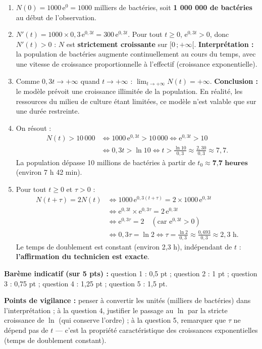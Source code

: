 \documentclass[11pt]{article}
\begin{document}
\begin{corrige}
\begin{enumerate}
\item $N(0)=1000\,\mathrm{e}^{0}=1000$ milliers de bactéries, soit \textbf{1 000 000 de bactéries} au début de l'observation.
\item $N'(t)=1000\times 0{,}3\,\mathrm{e}^{0{,}3t}=300\,\mathrm{e}^{0{,}3t}$.
Pour tout $t\geq 0$, $\mathrm{e}^{0{,}3t}>0$, donc $N'(t)>0$ : $N$ est \textbf{strictement croissante} sur $[0\,;+\infty[$.
\textbf{Interprétation :} la population de bactéries augmente continuellement au cours du temps, avec une vitesse de croissance proportionnelle à l'effectif (croissance exponentielle).
\item Comme $0{,}3t\to +\infty$ quand $t\to +\infty$ : $\displaystyle\lim_{t\to +\infty}N(t)=+\infty$.
\textbf{Conclusion :} le modèle prévoit une croissance illimitée de la population. En réalité, les ressources du milieu de culture étant limitées, ce modèle n'est valable que sur une durée restreinte.
\item On résout :
\begin{align*}
N(t)>10\,000 &\iff 1000\,\mathrm{e}^{0{,}3t}>10\,000 \iff \mathrm{e}^{0{,}3t}>10\\
&\iff 0{,}3t>\ln 10 \iff t>\frac{\ln 10}{0{,}3}\approx \frac{2{,}30}{0{,}3}\approx 7{,}7.
\end{align*}
La population dépasse 10 millions de bactéries à partir de $t_{0}\approx \textbf{7,7 heures}$ (environ 7 h 42 min).
\item Pour tout $t\geq 0$ et $\tau>0$ :
\begin{align*}
N(t+\tau)=2N(t) &\iff 1000\,\mathrm{e}^{0{,}3(t+\tau)}=2\times 1000\,\mathrm{e}^{0{,}3t}\\
&\iff \mathrm{e}^{0{,}3t}\times\mathrm{e}^{0{,}3\tau}=2\,\mathrm{e}^{0{,}3t}\\
&\iff \mathrm{e}^{0{,}3\tau}=2 \quad (\text{car }\mathrm{e}^{0{,}3t}>0)\\
&\iff 0{,}3\tau=\ln 2 \iff \tau=\frac{\ln 2}{0{,}3}\approx\frac{0{,}693}{0{,}3}\approx 2{,}3\text{ h}.
\end{align*}
Le temps de doublement est constant (environ 2,3 h), indépendant de $t$ : \textbf{l'affirmation du technicien est exacte}.
\end{enumerate}
\textbf{Barème indicatif (sur 5 pts) :} question 1 : 0,5 pt ; question 2 : 1 pt ; question 3 : 0,75 pt ; question 4 : 1,25 pt ; question 5 : 1,5 pt.

\textbf{Points de vigilance :} penser à convertir les unités (milliers de bactéries) dans l'interprétation ; à la question 4, justifier le passage au $\ln$ par la stricte croissance de $\ln$ (qui conserve l'ordre) ; à la question 5, remarquer que $\tau$ ne dépend pas de $t$ --- c'est la propriété caractéristique des croissances exponentielles (temps de doublement constant).
\end{corrige}
\end{document}
